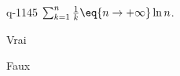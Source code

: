 \begin{truefalse}{q-1145}
$\sum_{k=1}^n\frac1{k} \eq{n\to+\infty} \ln n$.
\item* Vrai
\item Faux
\end{truefalse}

